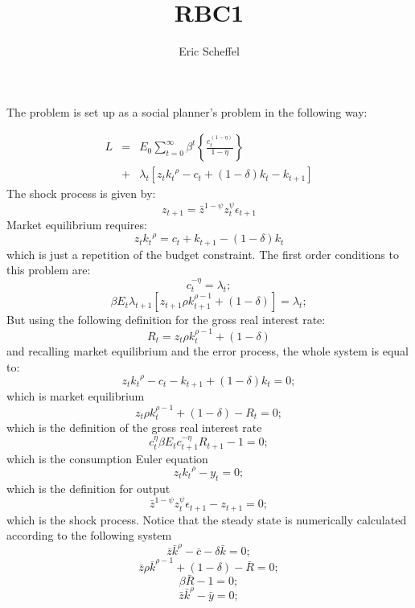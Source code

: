 \documentclass[a4paper,11pt]{article}
\title{RBC1}
\author{Eric Scheffel}
\begin{document}
\maketitle


The problem is set up as a social planner's problem in the following way:

\begin{eqnarray*}
L & = & E_0\sum_{t=0}^\infty\beta^t\left\lbrace\frac{c_t^{\left(1-\eta\right)}}{1-\eta}\right\rbrace\\
  & + & \lambda_t\left[{z_t}{k_t}^\rho-c_t+\left(1-\delta\right)k_t-k_{t+1}\right]
\end{eqnarray*}
The shock process is given by:
\[z_{t+1}=\bar{z}^{1-\psi}z_t^\psi\epsilon_{t+1}\]
Market equilibrium requires:
\[{z_t}{k_t}^\rho = c_t+k_{t+1}-\left(1-\delta\right)k_t\]
which is just a repetition of the budget constraint.
The first order conditions to this problem are:
\[
c_t^{-\eta}=\lambda_t;
\]
\[
\beta E_t\lambda_{t+1}\left[z_{t+1}\rho k_{t+1}^{\rho-1}+\left(1-\delta\right)\right]=\lambda_t;
\]
But using the following definition for the gross real interest rate:
\[
R_t=z_t\rho k_t^{\rho-1}+\left(1-\delta\right)
\]
and recalling market equilibrium and the error process, the whole system is equal to:
\begin{equation}
{z_t}{k_t}^\rho-c_t-k_{t+1}+\left(1-\delta\right)k_t=0;
\end{equation}
which is market equilibrium
\begin{equation}
z_t\rho k_t^{\rho-1}+\left(1-\delta\right)-R_t=0;
\end{equation}
which is the definition of the gross real interest rate
\begin{equation}
c_t^\eta\beta E_t c_{t+1}^{-\eta}R_{t+1}-1=0;
\end{equation}
which is the consumption Euler equation
\begin{equation}
{z_t}{k_t}^\rho-y_t=0;
\end{equation}
which is the definition for output
\begin{equation}
\bar{z}^{1-\psi}z_t^\psi\epsilon_{t+1}-z_{t+1}=0;
\end{equation}
which is the shock process. Notice that the steady state is numerically
calculated according to the following system
\[\bar{z}\bar{k}^\rho-\bar{c}-\delta \bar{k}=0;\]
\[\bar{z}\rho\bar{k}^{\rho-1}+\left(1-\delta\right)-\bar{R}=0;\]
\[\beta\bar{R}-1=0;\]
\[\bar{z}\bar{k}^\rho-\bar{y}=0;\]
\end{document}
